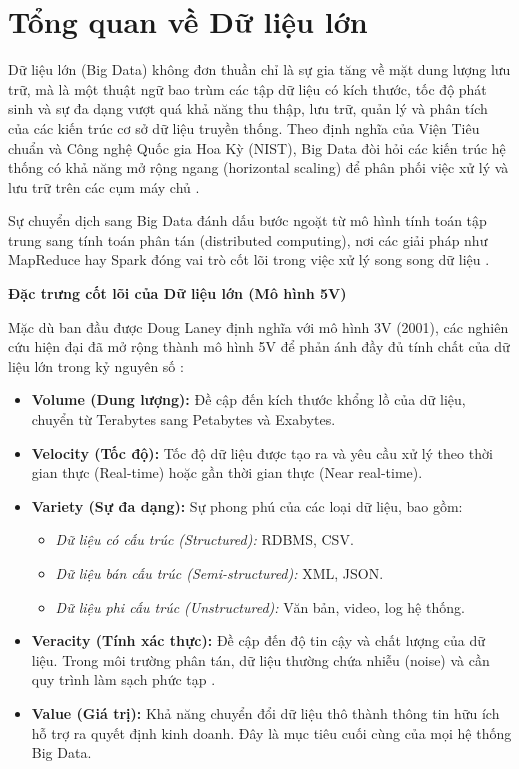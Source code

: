 \section{Tổng quan về Dữ liệu lớn}

Dữ liệu lớn (Big Data) không đơn thuần chỉ là sự gia tăng về mặt dung lượng lưu trữ, mà là một thuật ngữ bao trùm các tập dữ liệu có kích thước, tốc độ phát sinh và sự đa dạng vượt quá khả năng thu thập, lưu trữ, quản lý và phân tích của các kiến trúc cơ sở dữ liệu truyền thống. Theo định nghĩa của Viện Tiêu chuẩn và Công nghệ Quốc gia Hoa Kỳ (NIST), Big Data đòi hỏi các kiến trúc hệ thống có khả năng mở rộng ngang (horizontal scaling) để phân phối việc xử lý và lưu trữ trên các cụm máy chủ \cite{NIST2015}.

Sự chuyển dịch sang Big Data đánh dấu bước ngoặt từ mô hình tính toán tập trung sang tính toán phân tán (distributed computing), nơi các giải pháp như MapReduce hay Spark đóng vai trò cốt lõi trong việc xử lý song song dữ liệu \cite{Dean2008}.

\vspace{0.5em}
\textbf{Đặc trưng cốt lõi của Dữ liệu lớn (Mô hình 5V)}
\vspace{0.5em}

Mặc dù ban đầu được Doug Laney định nghĩa với mô hình 3V (2001), các nghiên cứu hiện đại đã mở rộng thành mô hình 5V để phản ánh đầy đủ tính chất của dữ liệu lớn trong kỷ nguyên số \cite{Laney2001}:

\begin{itemize}
    \item \textbf{Volume (Dung lượng):} Đề cập đến kích thước khổng lồ của dữ liệu, chuyển từ Terabytes sang Petabytes và Exabytes.
    \item \textbf{Velocity (Tốc độ):} Tốc độ dữ liệu được tạo ra và yêu cầu xử lý theo thời gian thực (Real-time) hoặc gần thời gian thực (Near real-time).
    \item \textbf{Variety (Sự đa dạng):} Sự phong phú của các loại dữ liệu, bao gồm:
    \begin{itemize}
        \item \textit{Dữ liệu có cấu trúc (Structured):} RDBMS, CSV.
        \item \textit{Dữ liệu bán cấu trúc (Semi-structured):} XML, JSON.
        \item \textit{Dữ liệu phi cấu trúc (Unstructured):} Văn bản, video, log hệ thống.
    \end{itemize}
    \item \textbf{Veracity (Tính xác thực):} Đề cập đến độ tin cậy và chất lượng của dữ liệu. Trong môi trường phân tán, dữ liệu thường chứa nhiễu (noise) và cần quy trình làm sạch phức tạp \cite{Wamba2015}.
    \item \textbf{Value (Giá trị):} Khả năng chuyển đổi dữ liệu thô thành thông tin hữu ích hỗ trợ ra quyết định kinh doanh. Đây là mục tiêu cuối cùng của mọi hệ thống Big Data.
\end{itemize}

